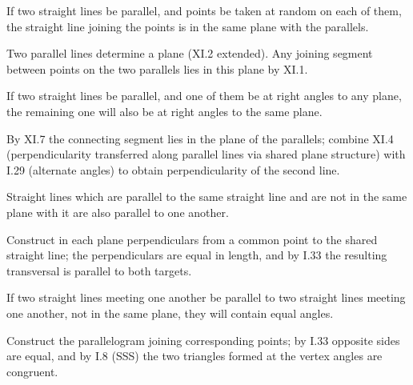 \begin{claim}
\label{prop:XI.7}
If two straight lines be parallel, and points be taken at random on
each of them, the straight line joining the points is in the same
plane with the parallels.
\end{claim}
\begin{evidence}[Proof of XI.7]
\label{ev:XI.7}
Two parallel lines determine a plane (XI.2 extended).  Any joining
segment between points on the two parallels lies in this plane by
XI.1.
\end{evidence}

\begin{claim}
\label{prop:XI.8}
If two straight lines be parallel, and one of them be at right angles
to any plane, the remaining one will also be at right angles to the
same plane.
\end{claim}
\begin{evidence}[Proof of XI.8]
\label{ev:XI.8}
By XI.7 the connecting segment lies in the plane of the parallels;
combine XI.4 (perpendicularity transferred along parallel lines via
shared plane structure) with I.29 (alternate angles) to obtain
perpendicularity of the second line.
\end{evidence}

\begin{claim}
\label{prop:XI.9}
Straight lines which are parallel to the same straight line and are
not in the same plane with it are also parallel to one another.
\end{claim}
\begin{evidence}[Proof of XI.9]
\label{ev:XI.9}
Construct in each plane perpendiculars from a common point to the
shared straight line; the perpendiculars are equal in length, and
by I.33 the resulting transversal is parallel to both targets.
\end{evidence}

\begin{claim}
\label{prop:XI.10}
If two straight lines meeting one another be parallel to two straight
lines meeting one another, not in the same plane, they will contain
equal angles.
\end{claim}
\begin{evidence}[Proof of XI.10]
\label{ev:XI.10}
Construct the parallelogram joining corresponding points; by I.33
opposite sides are equal, and by I.8 (SSS) the two triangles formed
at the vertex angles are congruent.
\end{evidence}

